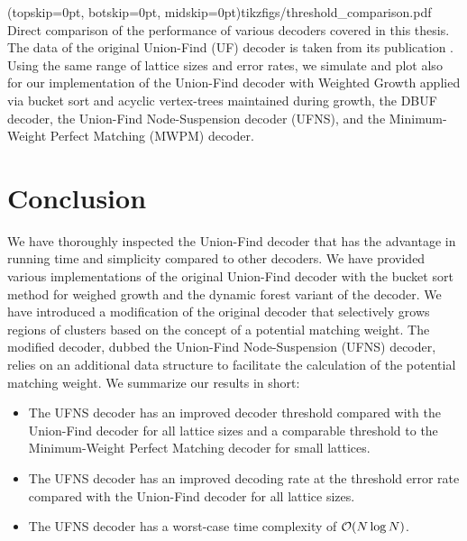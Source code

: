 \Figure[htb](topskip=0pt, botskip=0pt, midskip=0pt){tikzfigs/threshold_comparison.pdf}{
  Direct comparison of the performance of various decoders covered in this thesis. The data of the original Union-Find (UF) decoder is taken from its publication \cite{delfosse2017almost}. Using the same range of lattice sizes and error rates, we simulate and plot also for our implementation of the Union-Find decoder with Weighted Growth applied via bucket sort and acyclic vertex-trees maintained during growth, the DBUF decoder, the Union-Find Node-Suspension decoder (UFNS), and the Minimum-Weight Perfect Matching (MWPM) decoder.\label{thres_comp}}
\section{Conclusion}\label{sec:conclusion}

We have thoroughly inspected the Union-Find decoder that has the advantage in running time and simplicity compared to other decoders. We have provided various implementations of the original Union-Find decoder with the bucket sort method for weighed growth and the dynamic forest variant of the decoder. We have introduced a modification of the original decoder that selectively grows regions of clusters based on the concept of a potential matching weight. The modified decoder, dubbed the Union-Find Node-Suspension (UFNS) decoder, relies on an additional data structure to facilitate the calculation of the potential matching weight. We summarize our results in short:

\begin{itemize}
  \item The UFNS decoder has an improved decoder threshold compared with the Union-Find decoder for all lattice sizes and a comparable threshold to the Minimum-Weight Perfect Matching decoder for small lattices.
  \item The UFNS decoder has an improved decoding rate at the threshold error rate compared with the Union-Find decoder for all lattice sizes. 
  \item The UFNS decoder has a worst-case time complexity of $\mathcal{O}(N\log{N})$. 
\end{itemize}

